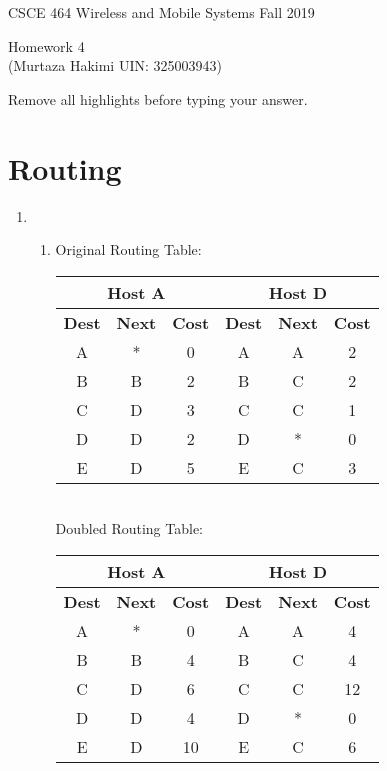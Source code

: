 \documentclass[11pt]{article}
\begin{document}
\newcommand{\answer}[1]{\mbox{~}}

{\large  CSCE 464 Wireless and Mobile Systems  \hfill Fall 2019\\
 \begin{center}
   Homework 4 \\
   (Murtaza Hakimi UIN: 325003943) \\
    \end{center}
}

Remove all highlights before typing your answer.

\section{Routing}
\begin{enumerate}[label=(\alph*)]
\item {
	\begin{enumerate}[label=(\alph*)]
		
	\item {
		Original Routing Table:
		
		\begin{tabular}{|ccc|ccc|}
		\hline
		\multicolumn{3}{|c|}{\textbf{Host A}} & \multicolumn{3}{c|}{\textbf{Host D}} \\ \hline
		\textbf{Dest} & \textbf{Next} & \textbf{Cost} & \textbf{Dest} & \textbf{Next} & \textbf{Cost} \\ \hline
		A & * & 0 & A & A & 2 \\
		B & B & 2 & B & C & 2 \\
		C & D & 3 & C & C & 1 \\
		D & D & 2 & D & * & 0 \\
		E & D & 5 & E & C & 3 \\ \hline
		\end{tabular} \\
		
		Doubled Routing Table:
		
		\begin{tabular}{|ccc|ccc|}
		\hline
		\multicolumn{3}{|c|}{\textbf{Host A}} & \multicolumn{3}{c|}{\textbf{Host D}} \\ \hline
		\textbf{Dest} & \textbf{Next} & \textbf{Cost} & \textbf{Dest} & \textbf{Next} & \textbf{Cost} \\ \hline
		A & * & 0 & A & A & 4 \\
		B & B & 4 & B & C & 4 \\
		C & D & 6 & C & C & 12 \\
		D & D & 4 & D & * & 0 \\
		E & D & 10 & E & C & 6 \\ \hline
		\end{tabular}
	}
	

\end{enumerate}}
\end{enumerate}
\end{document}
